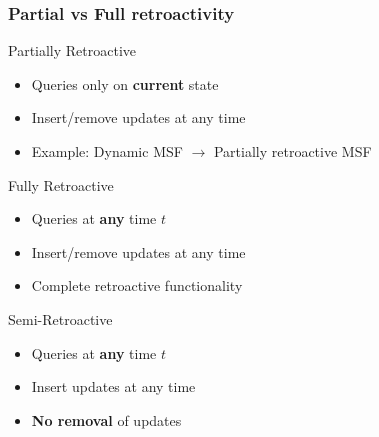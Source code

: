 \documentclass[fleqn]{beamer}
\begin{document}
\begin{frame}
    \frametitle{Partial vs Full retroactivity}
    
    \begin{block}{Partially Retroactive}
        \begin{itemize}
        \item Queries only on \textbf{current} state
        \item Insert/remove updates at any time
        \item Example: Dynamic MSF $\rightarrow$ Partially retroactive MSF
        \end{itemize}
    \end{block} \pause
    
    \begin{block}{Fully Retroactive}
        \begin{itemize}
        \item Queries at \textbf{any} time $t$
        \item Insert/remove updates at any time
        \item Complete retroactive functionality
        \end{itemize}
    \end{block} \pause
    
    \begin{block}{Semi-Retroactive}
        \begin{itemize}
        \item Queries at \textbf{any} time $t$
        \item Insert updates at any time
        \item \textbf{No removal} of updates
        \end{itemize}
    \end{block}
\end{frame}
\end{document}

